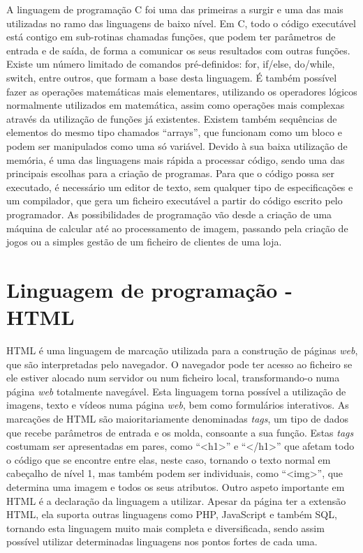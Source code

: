 A linguagem de programação C foi uma das primeiras a surgir e uma das mais utilizadas no ramo das linguagens de baixo nível.
Em C, todo o código executável está contigo em sub-rotinas chamadas funções, que podem ter parâmetros de entrada e de saída, de forma a comunicar os seus resultados com outras funções.
Existe um número limitado de comandos pré-definidos: for, if/else, do/while, switch, entre outros, que formam a base desta linguagem.
É também possível fazer as operações matemáticas mais elementares, utilizando os operadores lógicos normalmente utilizados em matemática, assim como operações mais complexas através da utilização de funções já existentes.
Existem também sequências de elementos do mesmo tipo chamados ``arrays'', que funcionam como um bloco e podem ser manipulados como uma só variável.
Devido à sua baixa utilização de memória, é uma das linguagens mais rápida a processar código, sendo uma das principais escolhas para a criação de programas.
Para que o código possa ser executado, é necessário um editor de texto, sem qualquer tipo de especificações e um compilador, que gera um ficheiro executável a partir do código escrito pelo programador.
As possibilidades de programação vão desde a criação de uma máquina de calcular até ao processamento de imagem, passando pela criação de jogos ou a simples gestão de um ficheiro de clientes de uma loja.

\section{Linguagem de programação - HTML}
\label{sec:html}

HTML é uma linguagem de marcação utilizada para a construção de páginas \emph{web}, que são interpretadas pelo navegador.
O navegador pode ter acesso ao ficheiro se ele estiver alocado num servidor ou num ficheiro local, transformando-o numa página \emph{web} totalmente navegável.
Esta linguagem torna possível a utilização de imagens, texto e vídeos numa página \emph{web}, bem como formulários interativos.
As marcações de HTML são maioritariamente denominadas \emph{tags}, um tipo de dados que recebe parâmetros de entrada e os molda, consoante a sua função.
Estas \emph{tags} costumam ser apresentadas em pares, como ``<h1>'' e ``</h1>'' que afetam todo o código que se encontre entre elas, neste caso, tornando o texto normal em cabeçalho de nível 1, mas também podem ser individuais, como ``<img>'', que determina uma imagem e todos os seus atributos.
Outro aspeto importante em HTML é a declaração da linguagem a utilizar.
Apesar da página ter a extensão HTML, ela suporta outras linguagens como PHP, JavaScript e também SQL, tornando esta linguagem muito mais completa e diversificada, sendo assim possível utilizar determinadas linguagens nos pontos fortes de cada uma.

